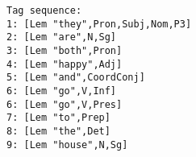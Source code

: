 \documentclass[a4paper, 11pt]{article}
\begin{document}
\begin{verbatim}
Tag sequence:
1: [Lem "they",Pron,Subj,Nom,P3]
2: [Lem "are",N,Sg]
3: [Lem "both",Pron]
4: [Lem "happy",Adj]
5: [Lem "and",CoordConj]
6: [Lem "go",V,Inf]
6: [Lem "go",V,Pres]
7: [Lem "to",Prep]
8: [Lem "the",Det]
9: [Lem "house",N,Sg]
\end{verbatim}


%
%
\end{document}

